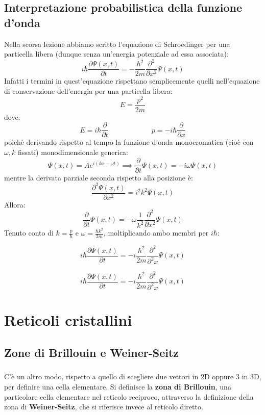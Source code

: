 \documentclass{book}
\begin{document}
    \section{Interpretazione probabilistica della funzione d'onda}
        Nella scorsa lezione abbiamo scritto l'equazione di Schroedinger per una particella libera (dunque senza un'energia potenziale ad essa associata):
        $$i \hbar \frac{\partial \Psi(x,t)}{\partial t} = -\frac{\hbar ^{2}}{2m} \frac{\partial ^{2}}{\partial x^{2}} \Psi(x,t) $$
        Infatti i termini in quest'equazione rispettano semplicemente quelli nell'equazione di conservazione dell'energia per una particella libera:
        $$E = \frac{p^{2}}{2m}$$
        dove:
        $$E = i\hbar \frac{\partial}{\partial t} \qquad \qquad \qquad p = -i \hbar \frac{\partial}{\partial x}$$
        poichè derivando rispetto al tempo la funzione d'onda monocromatica (cioè con $\omega, k$ fissati) monodimensionale generica:
        $$\Psi(x,t) = Ae^{i(kx - \omega t)} \implies \frac{\partial}{\partial t} \Psi(x,t) = -i\omega \Psi(x,t)$$
        mentre la derivata parziale seconda rispetto alla posizione è:
        $$\frac{\partial^{2} \Psi(x,t)}{\partial x^{2}} = i^{2}k^{2}\Psi(x,t) $$
        Allora:
        $$\frac{\partial}{\partial t} \Psi(x,t) = - \omega \frac{1}{k^{2}} \frac{\partial ^{2}}{\partial x^{2}}\Psi(x,t)$$
        Tenuto conto di $k=\frac{p}{\hbar}$ e $\omega = \frac{\hbar k^{2}}{2m}$, moltiplicando ambo membri per $i \hbar$:
        
        $$ i \hbar \frac{\partial \Psi(x,t)}{\partial t} = -i \frac{\hbar^{2}}{2m} \frac{\partial ^{2}}{\partial ^{2}x} \Psi(x,t)$$
        
        $$ i \hbar \frac{\partial \Psi(x,t)}{\partial t} = -i \frac{\hbar^{2}}{2m} \frac{\partial ^{2}}{\partial ^{2}x} \Psi(x,t)$$
        
        
        
        
        
\chapter{Reticoli cristallini}
        \section{Zone di Brillouin e Weiner-Seitz}
        \paragraph{}
            C'è un altro modo, rispetto a quello di scegliere due vettori in 2D oppure 3 in 3D, per definire una cella elementare. Si definisce la \textbf{zona di Brillouin}, una particolare cella elementare nel reticolo reciproco, attraverso la definizione della zona di \textbf{Weiner-Seitz}, che si riferisce invece al reticolo diretto.
\end{document}
